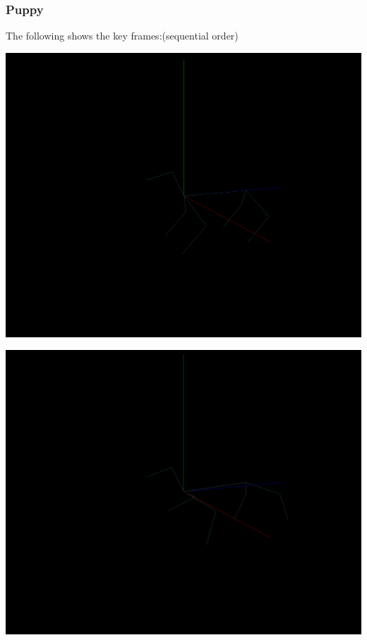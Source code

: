 \documentclass[a4paper, 11pt]{article}
\begin{document}
        \subsubsection{Puppy}
            The following shows the key frames:(sequential order)
            \begin{center}
                \includegraphics[width = \textwidth]{Animation2-1.PNG}
            \end{center}
            \begin{center}
                \includegraphics[width = \textwidth]{Animation2-2.PNG}
            \end{center}
\end{document}
